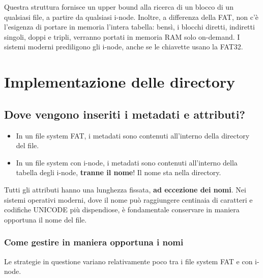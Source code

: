 \documentclass{report}
\begin{document}
\begin{itemize}
Questra struttura fornisce un upper bound alla ricerca di un blocco di un qualsiasi file, a partire da qualsiasi i-node. Inoltre, a differenza della FAT, non c'è l'esigenza di portare in memoria l'intera tabella: bensì, i blocchi diretti, indiretti singoli, doppi e tripli, verranno portati in memoria RAM solo on-demand. I sistemi moderni prediligono gli i-node, anche se le chiavette usano la FAT32.

\end{itemize}

\newpage

\section{Implementazione delle directory}

\subsection{Dove vengono inseriti i metadati e attributi?}
\begin{itemize}
    \item In un file system FAT, i metadati sono contenuti all'interno della directory del file.
    \item In un file system con i-node, i metadati sono contenuti all'interno della tabella degli i-node, \textbf{tranne il nome}! Il nome sta nella directory.
\end{itemize}

Tutti gli attributi hanno una lunghezza fissata, \textbf{ad eccezione dei nomi}. Nei sistemi operativi moderni, dove il nome può raggiungere centinaia di caratteri e codifiche UNICODE più dispendiose, è fondamentale conservare in maniera opportuna il nome del file.

\subsubsection{Come gestire in maniera opportuna i nomi}
Le strategie in questione variano relativamente poco tra i file system FAT e con i-node.
\end{document}
